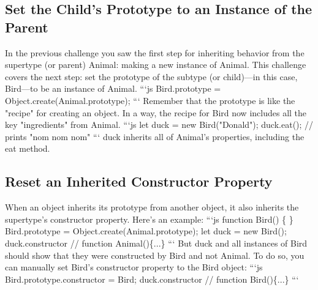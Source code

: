 \documentclass{article}%
\begin{document}
%
\subsection{Set the Child's Prototype to an Instance of the Parent}%
\label{subsec:SettheChildsPrototypetoanInstanceoftheParent}%
In the previous challenge you saw the first step for inheriting behavior from the supertype (or parent) Animal: making a new instance of Animal.\newline%
This challenge covers the next step: set the prototype of the subtype (or child)—in this case, Bird—to be an instance of Animal.\newline%
```js\newline%
Bird.prototype = Object.create(Animal.prototype);\newline%
```\newline%
Remember that the prototype is like the "recipe" for creating an object. In a way, the recipe for Bird now includes all the key "ingredients" from Animal.\newline%
```js\newline%
let duck = new Bird("Donald");\newline%
duck.eat(); // prints "nom nom nom"\newline%
```\newline%
duck inherits all of Animal's properties, including the eat method.\newline%

%
\subsection{Reset an Inherited Constructor Property}%
\label{subsec:ResetanInheritedConstructorProperty}%
When an object inherits its prototype from another object, it also inherits the supertype's constructor property.\newline%
Here's an example:\newline%
```js\newline%
function Bird() \{ \}\newline%
Bird.prototype = Object.create(Animal.prototype);\newline%
let duck = new Bird();\newline%
duck.constructor // function Animal()\{...\}\newline%
```\newline%
But duck and all instances of Bird should show that they were constructed by Bird and not Animal. To do so, you can manually set Bird's constructor property to the Bird object:\newline%
```js\newline%
Bird.prototype.constructor = Bird;\newline%
duck.constructor // function Bird()\{...\}\newline%
```\newline%
\end{document}

